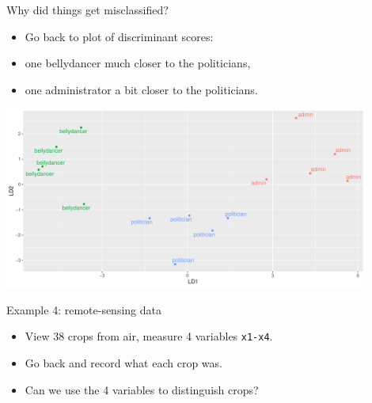 \documentclass[
  ignorenonframetext,
]{beamer}
\begin{document}
\begin{frame}{Why did things get misclassified?}
\protect\hypertarget{why-did-things-get-misclassified}{}

\begin{minipage}[t]{0.3\linewidth}

\begin{itemize}

\item Go back to plot of discriminant scores:

\item one bellydancer much closer to the politicians,

\item one administrator a bit closer to the politicians.
\end{itemize}
\end{minipage}\hfill
\begin{minipage}[t][][b]{0.68\linewidth}

\includegraphics[width=0.9\textwidth]{nesta}
       
\end{minipage}

\end{frame}

\begin{frame}[fragile]{Example 4: remote-sensing data}
\protect\hypertarget{example-4-remote-sensing-data}{}

\begin{itemize}
\item
  View 38 crops from air, measure 4 variables \texttt{x1-x4}.
\item
  Go back and record what each crop was.
\item
  Can we use the 4 variables to distinguish crops?
\end{itemize}

\end{frame}
\end{document}
